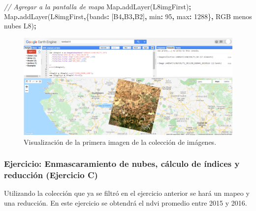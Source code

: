\documentclass[
  12pt,
  letterpaper,
  twoside]{book}
\newenvironment{Shaded}{\begin{snugshade}}{\end{snugshade}}
\newcommand{\BuiltInTok}[1]{#1}
\newcommand{\CommentTok}[1]{\textcolor[rgb]{0.56,0.35,0.01}{\textit{#1}}}
\newcommand{\DataTypeTok}[1]{\textcolor[rgb]{0.13,0.29,0.53}{#1}}
\newcommand{\DecValTok}[1]{\textcolor[rgb]{0.00,0.00,0.81}{#1}}
\newcommand{\FunctionTok}[1]{\textcolor[rgb]{0.00,0.00,0.00}{#1}}
\newcommand{\NormalTok}[1]{#1}
\newcommand{\OperatorTok}[1]{\textcolor[rgb]{0.81,0.36,0.00}{\textbf{#1}}}
\newcommand{\StringTok}[1]{\textcolor[rgb]{0.31,0.60,0.02}{#1}}
\begin{document}
\begin{Shaded}
\begin{Highlighting}[]
\CommentTok{// Agregar a la pantalla de mapa}
\BuiltInTok{Map}\OperatorTok{.}\FunctionTok{addLayer}\NormalTok{(L8imgFirst)}\OperatorTok{;}
\BuiltInTok{Map}\OperatorTok{.}\FunctionTok{addLayer}\NormalTok{(L8imgFirst}\OperatorTok{,}\NormalTok{\{}\DataTypeTok{bands}\OperatorTok{:}\NormalTok{ [}\StringTok{\textquotesingle{}B4\textquotesingle{}}\OperatorTok{,}\StringTok{\textquotesingle{}B3\textquotesingle{}}\OperatorTok{,}\StringTok{\textquotesingle{}B2\textquotesingle{}}\NormalTok{]}\OperatorTok{,} \DataTypeTok{min}\OperatorTok{:} \DecValTok{95}\OperatorTok{,} \DataTypeTok{max}\OperatorTok{:} \DecValTok{1288}\NormalTok{\}}\OperatorTok{,} 
  \StringTok{\textquotesingle{}RGB menos nubes L8\textquotesingle{}}\NormalTok{)}\OperatorTok{;}
\end{Highlighting}
\end{Shaded}

\begin{figure}[btp]

{\centering \includegraphics[width=1\linewidth]{Img/RGBIm} 

}

\caption{Visualización de la primera imagen de la colección de imágenes.}\label{fig:unnamed-chunk-153}
\end{figure}

\hypertarget{ejercicio-enmascaramiento-de-nubes-cuxe1lculo-de-uxedndices-y-reducciuxf3n-ejercicio-c}{%
\subsubsection{Ejercicio: Enmascaramiento de nubes, cálculo de índices y reducción (Ejercicio C)}\label{ejercicio-enmascaramiento-de-nubes-cuxe1lculo-de-uxedndices-y-reducciuxf3n-ejercicio-c}}

Utilizando la colección que ya se filtró en el ejercicio anterior se hará un mapeo y una reducción. En este ejercicio se obtendrá el ndvi promedio entre 2015 y 2016.
\end{document}
